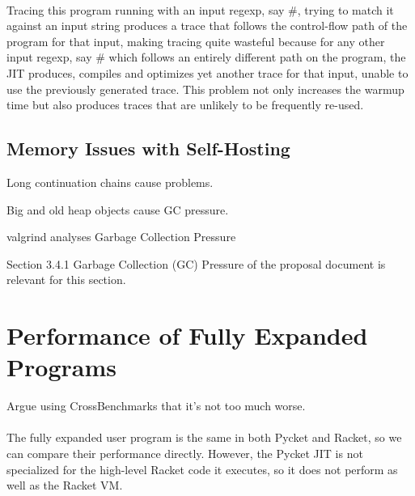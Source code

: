 		\paragraph{}%
		Tracing this program running with an input regexp, say
		$\mathtt{\#}$, trying to match it against an
		input string produces a trace that follows the control-flow path of
		the program for that input, making tracing quite wasteful because for
		any other input regexp, say $\mathtt{\#}$ which
		follows an entirely different path on the program, the JIT produces,
		compiles and optimizes yet another trace for that input, unable to use
		the previously generated trace. This problem not only increases the
		warmup time but also produces traces that are unlikely to be
		frequently re-used.



		\subsection{Memory Issues with Self-Hosting}
		\label{subsection:memory}

			\begin{mainpoint}
				Long continuation chains cause problems.

				Big and old heap objects cause GC pressure.
			\end{mainpoint}

			valgrind analyses
			Garbage Collection Pressure

			\begin{todo}[Import]
				Section 3.4.1 Garbage Collection (GC) Pressure of the proposal document is relevant for this section.
			\end{todo}

	\section{Performance of Fully Expanded Programs}
	\label{section:cross-benchmarks}

		\begin{mainpoint}
				Argue using CrossBenchmarks that it's not too much worse.
		\end{mainpoint}

		\paragraph{}%
		The fully expanded user program is the same in both Pycket and Racket, so we can compare their performance directly.  However, the Pycket JIT is not specialized for the high-level Racket code it executes, so it does not perform as well as the Racket VM.






